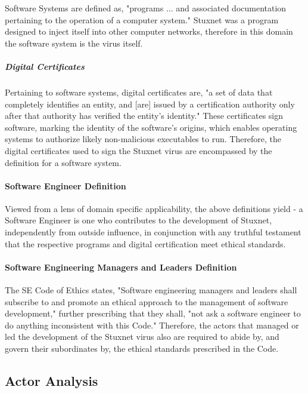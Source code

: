 \documentclass[12pt]{article}
\begin{document}
\begin{multicols}{2}
Software Systems are defined as, "programs ... and associated documentation pertaining to the operation of a computer system."\cite{softwareSystemDefinition} Stuxnet was a program designed to inject itself into other computer networks, therefore in this domain the software system is the virus itself.\cite{w32.stuxnetDossier}

\subparagraph{Digital Certificates}
Pertaining to software systems, digital certificates are, "a set of data that completely identifies an entity, and [are] issued by a certification authority only after that authority has verified the entity's identity."\cite{digitalCertificateDefintion} These certificates sign software, marking the identity of the software's origins, which enables operating systems to authorize likely non-malicious executables to run. Therefore, the digital certificates used to sign the Stuxnet virus are encompassed by the definition for a software system.

\paragraph{Software Engineer Definition}

Viewed from a lens of domain specific applicability, the above definitions yield - a Software Engineer is one who contributes to the development of Stuxnet, independently from outside influence, in conjunction with any truthful testament that the respective programs and digital certification meet ethical standards.

\paragraph{Software Engineering Managers and Leaders Definition}

The SE Code of Ethics states, "Software engineering managers and leaders shall subscribe to and promote an ethical approach to the management of software development," further prescribing that they shall, "not ask a software engineer to do anything inconsistent with this Code."\cite{softwareEngineeringCodeOfEthics} Therefore, the actors that managed or led the development of the Stuxnet virus also are required to abide by, and govern their subordinates by, the ethical standards prescribed in the Code.


\subsection{Actor Analysis}


\end{multicols}
\end{document}
